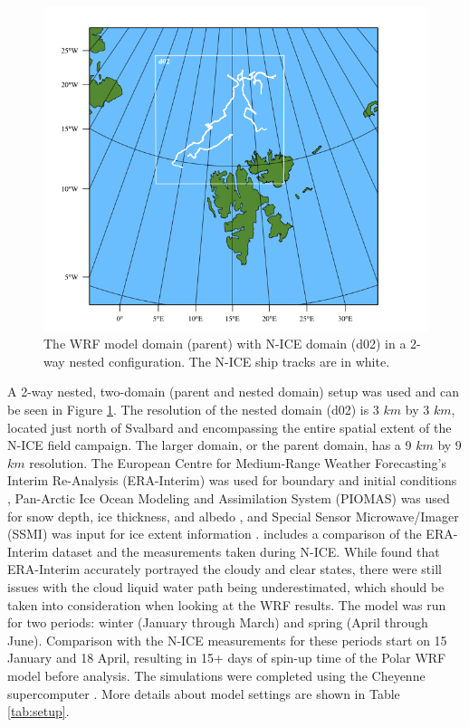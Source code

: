 \begin{figure}[h]
    \centering
    \includegraphics[width=1\linewidth]{figures/chapter3/wrf_domain.png}
    \caption[WRF Model Domain]{The WRF model domain (parent) with N-ICE domain (d02) in a 2-way nested configuration. The N-ICE ship tracks are in white.}
    \label{fig:wrf_domain}
\end{figure}

A 2-way nested, two-domain (parent and nested domain) setup was used and can be seen in Figure \ref{fig:wrf_domain}. The resolution of the nested domain (d02) is 3 $km$ by 3 $km$, located just north of Svalbard and encompassing the entire spatial extent of the N-ICE field campaign. The larger domain, or the parent domain, has a 9 $km$ by 9 $km$ resolution. The European Centre for Medium-Range Weather Forecasting’s Interim Re-Analysis (ERA-Interim) was used for boundary and initial conditions \citep{dee:2011}, Pan-Arctic Ice Ocean Modeling and Assimilation System (PIOMAS) was used for snow depth, ice thickness, and albedo \citep{PIOMASS}, and Special Sensor Microwave/Imager (SSMI) was input for ice extent information \citep{SSMI, schweiger:2011}. \citet{graham:2017} includes a comparison of the ERA-Interim dataset and the measurements taken during N-ICE. While \citet{graham:2017} found that ERA-Interim accurately portrayed the cloudy and clear states, there were still issues with the cloud liquid water path being underestimated, which should be taken into consideration when looking at the WRF results. The model was run for two periods: winter (January through March) and spring (April through June). Comparison with the N-ICE measurements for these periods start on 15 January and 18 April, resulting in 15+ days of spin-up time of the Polar WRF model before analysis. The simulations were completed using the Cheyenne supercomputer \citep{cheyenne}. More details about model settings are shown in Table \ref{tab:setup}. 

